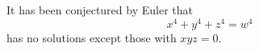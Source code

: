 \begin{proposition}\label{eq:123}
    It has been conjectured by Euler that
\[
    x^4+y^4+z^4=w^4
\]
    has no solutions except those with $xyz=0$.
\end{proposition}
